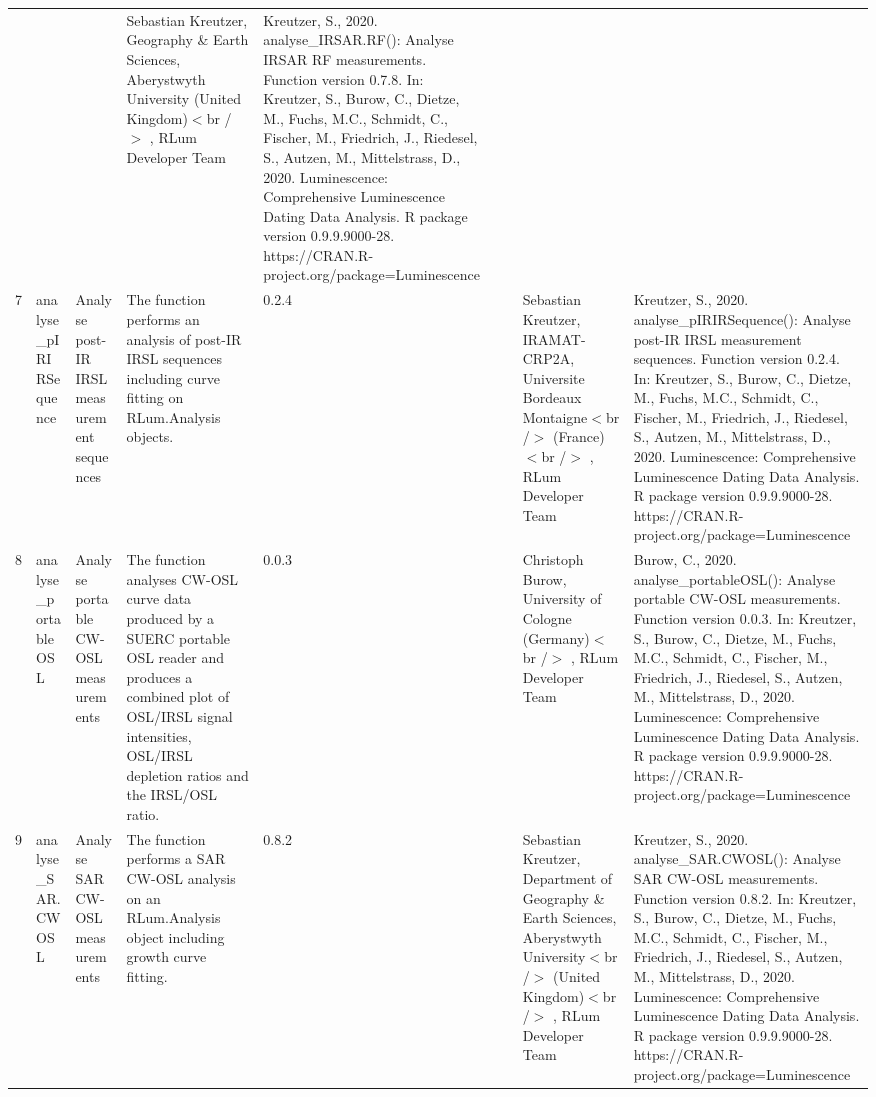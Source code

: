 \begin{table}[ht]
\begin{tabular}{rllllllll}
 &  &  & Sebastian Kreutzer, Geography \& Earth Sciences, Aberystwyth University (United Kingdom)$<$br /$>$ , RLum Developer Team & Kreutzer, S., 2020. analyse\_IRSAR.RF(): Analyse IRSAR RF measurements. Function version 0.7.8. In: Kreutzer, S., Burow, C., Dietze, M., Fuchs, M.C., Schmidt, C., Fischer, M., Friedrich, J., Riedesel, S., Autzen, M., Mittelstrass, D., 2020. Luminescence: Comprehensive Luminescence Dating Data Analysis. R package version 0.9.9.9000-28. https://CRAN.R-project.org/package=Luminescence
 \\ 
  7 & analyse\_pIRIRSequence & Analyse post-IR IRSL measurement sequences & The function performs an analysis of post-IR IRSL sequences including curve fitting on  RLum.Analysis  objects. & 0.2.4
 &  &  & Sebastian Kreutzer, IRAMAT-CRP2A, Universite Bordeaux Montaigne$<$br /$>$ (France)$<$br /$>$ , RLum Developer Team & Kreutzer, S., 2020. analyse\_pIRIRSequence(): Analyse post-IR IRSL measurement sequences. Function version 0.2.4. In: Kreutzer, S., Burow, C., Dietze, M., Fuchs, M.C., Schmidt, C., Fischer, M., Friedrich, J., Riedesel, S., Autzen, M., Mittelstrass, D., 2020. Luminescence: Comprehensive Luminescence Dating Data Analysis. R package version 0.9.9.9000-28. https://CRAN.R-project.org/package=Luminescence
 \\ 
  8 & analyse\_portableOSL & Analyse portable CW-OSL measurements & The function analyses CW-OSL curve data produced by a SUERC portable OSL reader and produces a combined plot of OSL/IRSL signal intensities, OSL/IRSL depletion ratios and the IRSL/OSL ratio. & 0.0.3
 &  &  & Christoph Burow, University of Cologne (Germany)$<$br /$>$ , RLum Developer Team & Burow, C., 2020. analyse\_portableOSL(): Analyse portable CW-OSL measurements. Function version 0.0.3. In: Kreutzer, S., Burow, C., Dietze, M., Fuchs, M.C., Schmidt, C., Fischer, M., Friedrich, J., Riedesel, S., Autzen, M., Mittelstrass, D., 2020. Luminescence: Comprehensive Luminescence Dating Data Analysis. R package version 0.9.9.9000-28. https://CRAN.R-project.org/package=Luminescence
 \\ 
  9 & analyse\_SAR.CWOSL & Analyse SAR CW-OSL measurements & The function performs a SAR CW-OSL analysis on an RLum.Analysis  object including growth curve fitting. & 0.8.2
 &  &  & Sebastian Kreutzer, Department of Geography \& Earth Sciences, Aberystwyth University$<$br /$>$ (United Kingdom)$<$br /$>$ , RLum Developer Team & Kreutzer, S., 2020. analyse\_SAR.CWOSL(): Analyse SAR CW-OSL measurements. Function version 0.8.2. In: Kreutzer, S., Burow, C., Dietze, M., Fuchs, M.C., Schmidt, C., Fischer, M., Friedrich, J., Riedesel, S., Autzen, M., Mittelstrass, D., 2020. Luminescence: Comprehensive Luminescence Dating Data Analysis. R package version 0.9.9.9000-28. https://CRAN.R-project.org/package=Luminescence

\end{tabular}
\end{table}
